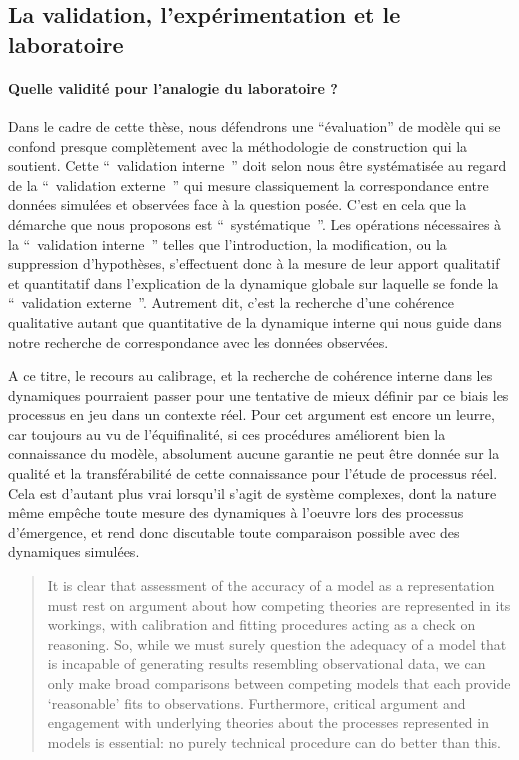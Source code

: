 \subsection{La validation, l'expérimentation et le laboratoire}

\paragraph{Quelle validité pour l'analogie du laboratoire ?}

Dans le cadre de cette thèse, nous défendrons une \enquote{évaluation} de modèle qui se confond presque complètement avec la méthodologie de construction qui la soutient. Cette \enquote{ validation interne } doit selon nous être systématisée au regard de la \enquote{ validation externe } qui mesure classiquement la correspondance entre données simulées et observées face à la question posée. C’est en cela que la démarche que nous proposons est \enquote{ systématique }. Les opérations nécessaires à la \enquote{ validation interne } telles que l'introduction, la modification, ou la suppression d'hypothèses, s’effectuent donc à la mesure de leur apport qualitatif et quantitatif dans l'explication de la dynamique globale sur laquelle se fonde la \enquote{ validation externe }. Autrement dit, c'est la recherche d'une cohérence qualitative autant que quantitative de la dynamique interne qui nous guide dans notre recherche de correspondance avec les données observées.

A ce titre, le recours au calibrage, et la recherche de cohérence interne dans les dynamiques pourraient passer pour une tentative de mieux définir par ce biais les processus en jeu dans un contexte réel. Pour \autocite{OSullivan2004} cet argument est encore un leurre, car toujours au vu de l'équifinalité, si ces procédures améliorent bien la connaissance du modèle, absolument aucune garantie ne peut être donnée sur la qualité et la transférabilité de cette connaissance pour l'étude de processus réel. Cela est d'autant plus vrai lorsqu'il s'agit de système complexes, dont la nature même empêche toute  mesure des dynamiques à l'oeuvre lors des processus d'émergence, et rend donc discutable toute comparaison possible avec des dynamiques simulées. 

\begin{quotation} It is clear that assessment of the accuracy of a model as a representation must rest on argument about how competing theories are represented in its workings, with calibration and fitting procedures acting as a check on reasoning. So, while we must surely question the adequacy of a model that is incapable of generating results resembling observational data, we can only make broad comparisons between competing models that each provide ‘reasonable’ fits to observations. Furthermore, critical argument and engagement with underlying theories about the processes represented in models is essential: no purely technical procedure can do better than this.  \\  \end{quotation}


